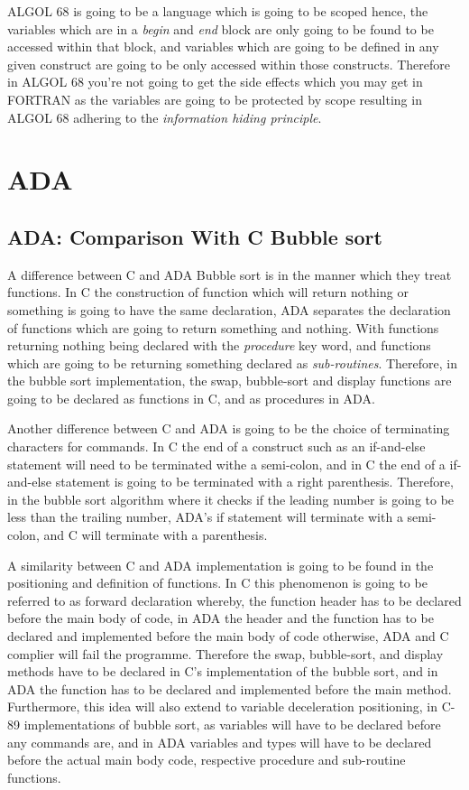 \documentclass[
	12pt, %
]{fphw}
\begin{document}
ALGOL 68 is going to be a language which is going to be scoped hence, the
variables which are in a \emph{begin} and \emph{end} block are only going to be
found to be accessed within that block, and variables which are going to be defined
in any given construct are going to be only accessed within those constructs.
Therefore in ALGOL 68 you're not going to get the side effects which you may get in
FORTRAN as the variables are going to be protected by scope resulting in ALGOL 68
adhering to the \emph{information hiding principle}. \par

\section{ADA}
\subsection{ADA: Comparison With C Bubble sort}
A difference between C and ADA Bubble sort is in the manner which they treat functions.
In C the construction of function which will return nothing or something
is going to have the same declaration, ADA separates the declaration of functions
which are going to return something and nothing. With functions returning nothing
being declared with the \emph{procedure} key word, and functions which are going to be
returning something declared as \emph{sub-routines}. Therefore, in the bubble
sort implementation, the swap, bubble-sort and display functions are going to be
declared as functions in C, and as procedures in ADA.\par

Another difference between C and ADA is going to be the choice of terminating characters
for commands. In C the end of a construct such as an if-and-else statement will
need to be terminated withe a semi-colon, and in C the end of a if-and-else
statement is going to be terminated with a right parenthesis. Therefore,
in the bubble sort algorithm where it checks if the leading number is going to be
less than the trailing number, ADA's if statement will terminate with a semi-colon,
and C will terminate with a parenthesis.\par

A similarity between C and ADA implementation is going to be found in the
positioning and definition of functions. In C this phenomenon is going to be
referred to as forward declaration whereby, the function header has to
be declared before the main body of code, in ADA the header and the function has
to be declared and implemented before the main body of code otherwise, ADA and C
complier will fail the programme. Therefore the swap, bubble-sort, and display
methods have to be declared in C's implementation of the bubble sort, and in ADA
the function has to be declared and implemented before the main method.
Furthermore, this idea will also extend to variable deceleration positioning, in C-89
implementations of bubble sort, as variables will have to be declared  before
any commands are, and in ADA variables and types will have to be declared before
the actual main body code, respective procedure and sub-routine functions.\par
\end{document}

